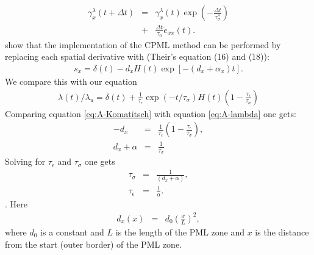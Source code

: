 \documentclass[11pt]{article}
\begin{document}
\begin{eqnarray*}
\gamma^{\lambda}_x(t+\Delta t) 
   & = & \gamma^{\lambda}_x (t)\exp(-\frac{\Delta t}{\tau^{\lambda}_{\sigma}}) \\
   & + & \frac{\Delta t}{\tau_{0}}\dot{e}_{xx}(t).
\end{eqnarray*}
\cite{Komatitsch2007} show that the implementation of the CPML method can
be performed by replacing each spatial derivative with
(Their's equation (16) and (18)):
\begin{eqnarray}
  s_x = \delta(t) - d_x H(t) \exp \left[-(d_x+\alpha_x)t\right].
                                          \label{eq:A-Komatitsch} 
\end{eqnarray}
We compare this with our equation
\begin{eqnarray}
  \lambda(t)/\lambda_u = \delta(t) + \frac{1}{\tau_{\epsilon}}
                         \exp(-t/\tau_{\sigma}) H(t)
                         \left(1-\frac{\tau_{\epsilon}}{\tau_{\sigma}}\right)
                                           \label{eq:A-lambda}
\end{eqnarray}
Comparing equation \eqref{eq:A-Komatitsch} with equation
\eqref{eq:A-lambda} one gets:
\begin{eqnarray}
-d_x         & = & \frac{1}{\tau_{\epsilon}}\left(1-\frac{\tau_{\epsilon}}
                                            {\tau_{\sigma}}\right), \\
d_x +\alpha & = & \frac{1}{\tau_{\sigma}}
\end{eqnarray}
Solving for $\tau_{\epsilon}$ and $\tau_{\sigma}$ one gets
\begin{eqnarray}
  \tau_{\sigma}   & = & \frac{1}{(d_x+\alpha)},\\
  \tau_{\epsilon} & = & \frac{1}{\alpha}.
\end{eqnarray}.
Here 
\begin{eqnarray}
 d_x (x) & = & d_0 \left(\frac{x}{L}\right)^2,
\end{eqnarray}
where $d_0$ is a constant and $L$ is the length of
the PML zone and $x$ is the distance from the start (outer border)
of the PML zone.
\end{document}
